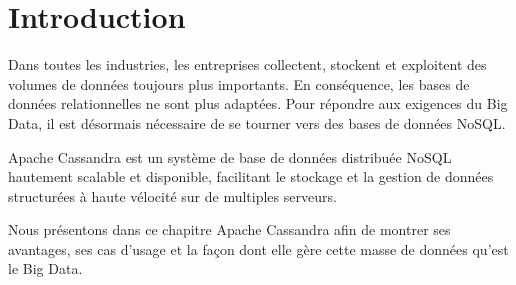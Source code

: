 \section*{Introduction}
Dans toutes les industries, les entreprises collectent, stockent et exploitent des volumes de données toujours plus importants. En conséquence, les bases de données relationnelles ne sont plus adaptées. Pour répondre aux exigences du Big Data, il est désormais nécessaire de se tourner vers des bases de données NoSQL.

Apache Cassandra est un système de base de données distribuée NoSQL hautement scalable et disponible, facilitant le stockage et la gestion de données structurées à haute vélocité sur de multiples serveurs.

Nous présentons dans ce chapitre Apache Cassandra afin de montrer ses avantages, ses cas d'usage et la façon dont elle gère cette masse de données qu'est le Big Data.